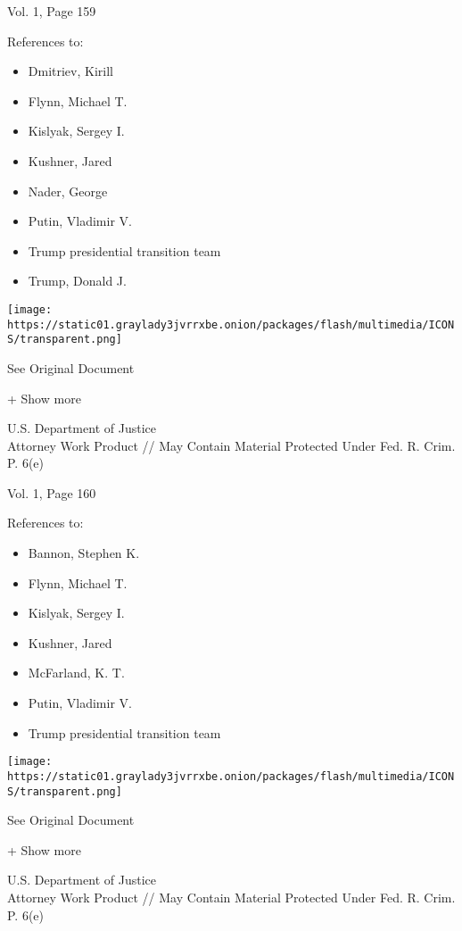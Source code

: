 Vol. 1, Page 159

References to:

\begin{itemize}
\tightlist
\item
  Dmitriev, Kirill
\item
  Flynn, Michael T.
\item
  Kislyak, Sergey I.
\item
  Kushner, Jared
\item
  Nader, George
\item
  Putin, Vladimir V.
\item
  Trump presidential transition team
\item
  Trump, Donald J.
\end{itemize}

\protect\hyperlink{}{}

\texttt{[image: https://static01.graylady3jvrrxbe.onion/packages/flash/multimedia/ICONS/transparent.png]}

See Original Document

+ Show more

U.S. Department of Justice\\
Attorney Work Product // May Contain Material Protected Under Fed. R.
Crim. P. 6(e)

Vol. 1, Page 160

References to:

\begin{itemize}
\tightlist
\item
  Bannon, Stephen K.
\item
  Flynn, Michael T.
\item
  Kislyak, Sergey I.
\item
  Kushner, Jared
\item
  McFarland, K. T.
\item
  Putin, Vladimir V.
\item
  Trump presidential transition team
\end{itemize}

\protect\hyperlink{}{}

\texttt{[image: https://static01.graylady3jvrrxbe.onion/packages/flash/multimedia/ICONS/transparent.png]}

See Original Document

+ Show more

U.S. Department of Justice\\
Attorney Work Product // May Contain Material Protected Under Fed. R.
Crim. P. 6(e)

